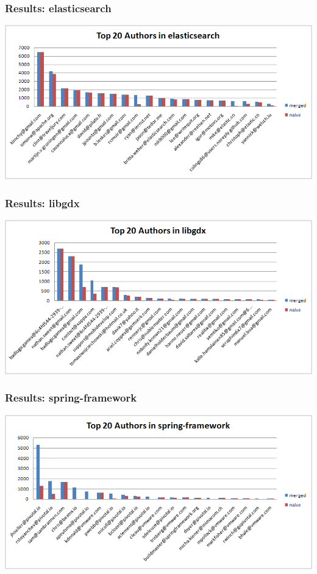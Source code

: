 \documentclass[slidestop,usenames,dvipsnames]{beamer}
\begin{document}
\begin{frame}
  \frametitle{Results: elasticsearch}
  \vfill
  \includegraphics[width=\textwidth]{img/graph-elasticsearch}
  \vfill
\end{frame}

\begin{frame}
  \frametitle{Results: libgdx}
  \vfill
  \includegraphics[width=\textwidth]{img/graph-libgdx}
  \vfill
\end{frame}

\begin{frame}
  \frametitle{Results: spring-framework}
  \vfill
  \includegraphics[width=\textwidth]{img/graph-spring-framework}
  \vfill
\end{frame}
\end{document}
